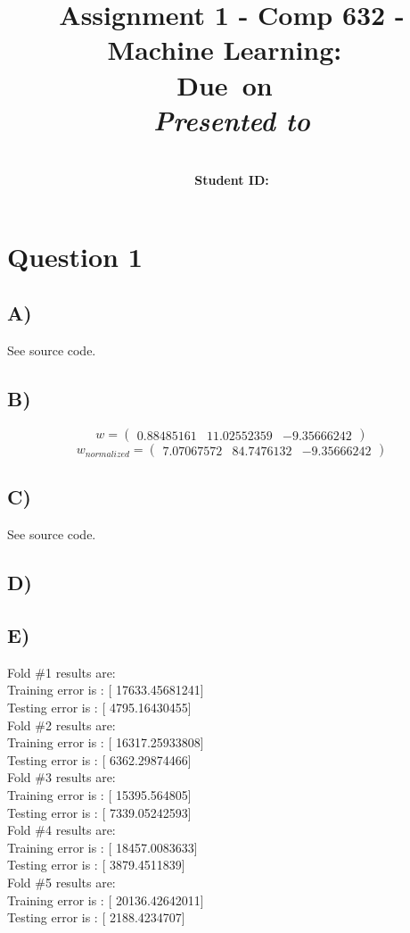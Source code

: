 \documentclass{report}
\title{Assignment 1 - Comp 632 - Machine Learning}
\title{\vspace{2in}\textmd{\textbf{\hmwkClass:\ \hmwkTitle}}\\\normalsize\vspace{0.1in}\small{Due\ on\ \hmwkDueDate}\\\vspace{0.1in}\large{\textit{Presented to \hmwkClassInstructor}}\vspace{3in}}
\date{}
\author{\textbf{\hmwkAuthorName}\\
    \textbf{Student ID: \hmwkAuthorNumber}}
\begin{document}
\maketitle
\section*{Question 1}
\subsection*{A)}
See source code.
\subsection*{B)}
\begin{equation}
  w = \begin{pmatrix}
        0.88485161 & 11.02552359 & -9.35666242
      \end{pmatrix}
\end{equation}
\begin{equation}
  w_{normalized} = \begin{pmatrix}
                    7.07067572 & 84.7476132 & -9.35666242
                    \end{pmatrix}
\end{equation}
\subsection*{C)}
See source code.
\subsection*{D)}
\subsection*{E)}
Fold \#1 results are:\\
Training error is : [ 17633.45681241]\\
Testing error is : [ 4795.16430455]\\
Fold \#2 results are:\\
Training error is : [ 16317.25933808]\\
Testing error is : [ 6362.29874466]\\
Fold \#3 results are:\\
Training error is : [ 15395.564805]\\
Testing error is : [ 7339.05242593]\\
Fold \#4 results are:\\
Training error is : [ 18457.0083633]\\
Testing error is : [ 3879.4511839]\\
Fold \#5 results are:\\
Training error is : [ 20136.42642011]\\
Testing error is : [ 2188.4234707]\\
\end{document}
